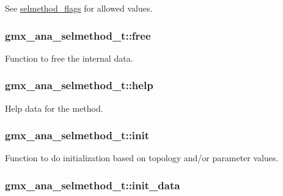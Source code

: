 \-See \hyperlink{share_2template_2gromacs_2selmethod_8h_selmethod_flags}{selmethod\-\_\-flags} for allowed values. \hypertarget{structgmx__ana__selmethod__t_ab375b67bff103a6cb59cd2e365014a14}{
\subsubsection[{free}]{ {\bf gmx\-\_\-ana\-\_\-selmethod\-\_\-t\-::free}}}\label{structgmx__ana__selmethod__t_ab375b67bff103a6cb59cd2e365014a14}
\-Function to free the internal data. \hypertarget{structgmx__ana__selmethod__t_ae7d6f1b14964a172d4d9ed38e50426a4}{
\subsubsection[{help}]{ {\bf gmx\-\_\-ana\-\_\-selmethod\-\_\-t\-::help}}}\label{structgmx__ana__selmethod__t_ae7d6f1b14964a172d4d9ed38e50426a4}
\-Help data for the method. \hypertarget{structgmx__ana__selmethod__t_ab8c8ba47a888095b9635219f488b4a0f}{
\subsubsection[{init}]{ {\bf gmx\-\_\-ana\-\_\-selmethod\-\_\-t\-::init}}}\label{structgmx__ana__selmethod__t_ab8c8ba47a888095b9635219f488b4a0f}
\-Function to do initialization based on topology and/or parameter values. \hypertarget{structgmx__ana__selmethod__t_af844fcaa1c2be666b4a8558aa0dd31c2}{
\subsubsection[{init\-\_\-data}]{ {\bf gmx\-\_\-ana\-\_\-selmethod\-\_\-t\-::init\-\_\-data}}}\label{structgmx__ana__selmethod__t_af844fcaa1c2be666b4a8558aa0dd31c2}
